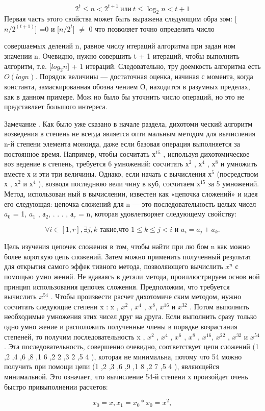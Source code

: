 \begin{equation*}
  2^t \le n < 2^{t+1} \  {\text {или} }  \  t \le \log_2 n < t+1 
\end{equation*}
Первая часть этого свойства может быть выражена следующим обра­
зом: [$n/2^(t+1)$] =0 и [$n/2^t$] $\not=$ 0 что позволяет точно определить число

\newpage
совершаемых делений n, равное числу итераций алгоритма при задан­
ном значении n. Очевидно, нужно совершить t + 1 итераций, чтобы
выполнить алгоритм, т.е. [$log_2 n$] + 1 итераций. Следовательно, тру­
доемкость алгоритма есть $O(log n)$. Порядок величины — достаточная
оценка, начиная с момента, когда константа, замаскированная обозна­
чением О, находится в разумных пределах, как в данном примере. Мож­
но было бы уточнить число операций, но это не представляет большого
интереса.
\newline

\begin{center}
\parbox{12cm}{
Замечание . Как было уже сказано в начале раздела, дихотоми­
ческий алгоритм возведения в степень не всегда является опти­
мальным методом для вычисления n-й степени элемента моноида,
даже если базовая операция выполняется за постоянное время.
Например, чтобы сосчитать $х^15$ , используя дихотомическое воз­
ведение в степень, требуется 6 умножений: сосчитать $х^2$ , $х^4$ , $х^8$
и умножить вместе х и эти три величины. Однако, если начать с
вычисления $х^5$ (посредством х , $х^2$ и $х^4$ ), возводя последнюю вели­
чину в куб, сосчитаем $х^15$ за 5 умножений. Метод, использован­
ный в вычислении, известен как «цепочка сложений» и идея его
следующая: цепочка сложений для n — это последовательность
целых чисел $a_0$ = 1, $a_1$ , $а_2$, . . . , $а_r$ = n, которая удовлетворяет сле­дующему свойству:}
\end{center}
\[
\forall i\in [1,r], \exists j,k \text{ такие,что } 1\leqslant k \leqslant j<i {\text{ и  }} a_i    =a_j + a_k .
\]
\begin{center}
\parbox{12cm}{
Цель изучения цепочек сложения в том, чтобы найти при лю­
бом n как можно более короткую цепь сложений. Затем можно
применить полученный результат для открытия самого эффек­
тивного метода, позволяющего вычислить $x^n$ с помощью умно­
жений. Не вдаваясь в детали метода, проиллюстрируем основ­
ной принцип использования цепочек сложения. Предположим, что
требуется вычислить $x^{54}$ . Чтобы произвести расчет дихотомиче­
ским методом, нужно сосчитать следующие степени x : x , $x^{2}$ , $x^{4}$ ,
$x^{8}$, $x^{16}$ и $x^{32}$ . Потом выполнить необходимые умножения этих
чисел друг на друга. Если выполнить сразу только одно умно­
жение и расположить полученные члены в порядке возрастания
степеней, то получим последовательность x , $x^{2} $ , $x^{4}$ , $x^{6}$ , $x^{8}$ , $x^{16}$, $x^{22}$ , $x^{32}$ и $x^{54}$ . Эта последовательность, совершенно очевидно, со­ответствует цепи сложений (1 ,2 ,4 ,6 ,8 ,1 6 ,2 2 ,3 2 ,5 4 ), которая не
минимальна, потому что 54 можно получить при помощи це­пи (1 ,2 ,3 ,6 ,9 ,1 8 ,2 7 ,5 4 ), являющейся минимальной. Это означа­ет, что вычисление 54-й степени х произойдет очень быстро привыполнении расчетов:}
\end{center}
\[
x_0=x,  x_1=x_0*x_0=x^2 ,
\]
\newpage

